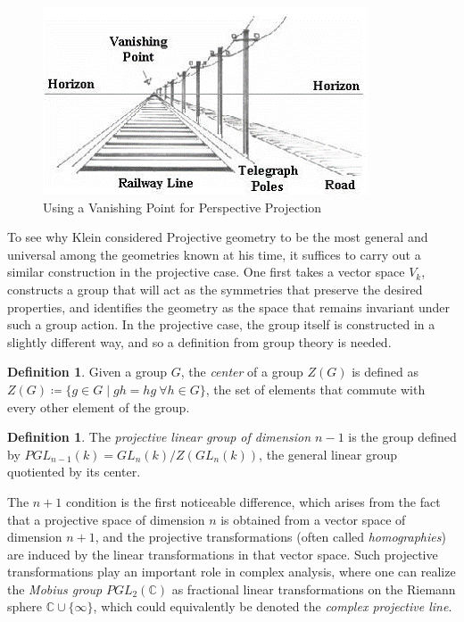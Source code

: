 \documentclass{article}
\theoremstyle{definition}
\newtheorem{definition}[theorem]{Definition} %
\newcommand\CC{\mathbb{C}}
\newcommand{\definedas}[0]{\coloneqq}
\newcommand{\theset}[1]{\{ #1 \}}
\begin{document}
\begin{figure}[h]
\centering
\includegraphics[width=0.8\linewidth]{vanishing.png}
\caption{Using a Vanishing Point for Perspective Projection}
\label{fig:my_label}
\end{figure}

To see why Klein considered Projective geometry to be the
most general and universal among the geometries known at his time, it
suffices to carry out a similar construction in the projective case. One
first takes a vector space \(V_k\), constructs a group that will act as
the symmetries that preserve the desired properties, and identifies the geometry as the space that remains invariant under such a group action. In the projective case, the group itself is constructed in a slightly different way, and so a definition from group theory is needed.

\begin{definition} Given a group \(G\), the \emph{center} of a group \(Z(G)\)
is defined as
\(Z(G) \definedas \theset{g\in G \mid gh = hg ~\forall h\in G}\), the
set of elements that commute with every other element of the group.
\end{definition}

\begin{definition} The \emph{projective linear group of dimension \(n-1\)} is
the group defined by \(PGL_{n-1}(k) = GL_n(k) / Z(GL_n(k))\), the
general linear group quotiented by its center.
\end{definition}

The \(n+1\) condition is the first noticeable difference, which arises
from the fact that a projective space of dimension \(n\) is obtained
from a vector space of dimension \(n+1\), and the projective
transformations (often called \emph{homographies}) are induced by the
linear transformations in that vector space. Such projective
transformations play an important role in complex analysis, where one
can realize the \emph{Mobius group} \(PGL_2(\CC)\) as fractional linear
transformations on the Riemann sphere \(\CC \cup \theset{\infty}\),
which could equivalently be denoted the \emph{complex projective line}.
\end{document}
